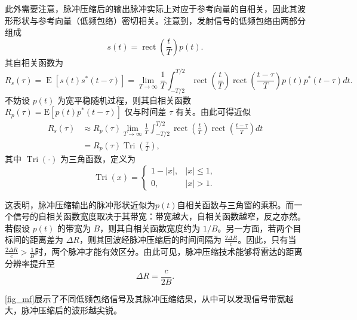 此外需要注意，脉冲压缩后的输出脉冲实际上对应于参考向量的自相关，因此其波形形状与参考向量（低频包络）密切相关。注意到，发射信号的低频包络由两部分组成
\[
    s(t) = \operatorname{rect}\left( \frac{t}{T} \right) p(t).
\]
其自相关函数为
\[
    R_s(\tau) = \operatorname{E}\left[ s(t)s^*(t-\tau)\right]
    = \lim_{T \rightarrow \infty } \frac{1}{T} \int_{-T/2}^{T/2} \operatorname{rect}\left( \frac{t}{T} \right)
    \operatorname{rect}\left( \frac{t-\tau}{T} \right)
    p(t)p^*(t-\tau)dt.
\]
不妨设 \(p(t)\) 为宽平稳随机过程，则其自相关函数\( R_p(\tau) = \mathrm{E}[p(t)p^*(t-\tau)] \) 仅与时间差 \(\tau\) 有关。由此可得近似
\[
    \begin{split}
        R_s(\tau) & \approx R_p(\tau)
        \lim_{T \rightarrow \infty } \frac{1}{T} \int_{-T/2}^{T/2}
        \operatorname{rect}\left( \frac{t}{T} \right)
        \operatorname{rect}\left( \frac{t-\tau}{T} \right) dt                    \\
                  & = R_p(\tau) \operatorname{Tri}\left( \frac{\tau}{T} \right),
    \end{split}
\]
其中 \(\operatorname{Tri}(\cdot)\) 为三角函数，定义为
\[
    \operatorname{Tri}(x) =
    \begin{cases}
        1-|x|, & |x|\leq 1, \\
        0,     & |x|>1.
    \end{cases}
\]

这表明，脉冲压缩输出的脉冲形状近似为\( p(t) \)自相关函数与三角窗的乘积。而一个信号的自相关函数宽度取决于其带宽：带宽越大，自相关函数越窄，反之亦然。若假设 \(p(t)\) 的带宽为 \(B\)，则其自相关函数宽度约为 \(1/B\)。另一方面，若两个目标间的距离差为 \(\Delta R\)，则其回波经脉冲压缩后的时间间隔为 \(\frac{2\Delta R}{c}\)。因此，只有当\(\frac{2\Delta R}{c} > \frac{1}{B}\)时，两个脉冲才能有效区分。由此可见，脉冲压缩技术能够将雷达的距离分辨率提升至
\[
    \Delta R = \frac{c}{2B}.
\]

\cref{fig_mf}展示了不同低频包络信号及其脉冲压缩结果，从中可以发现信号带宽越大，脉冲压缩后的波形越尖锐。

